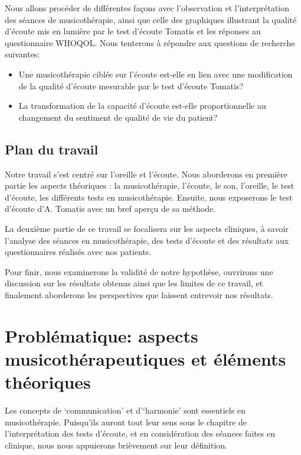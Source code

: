 Nous allons procéder de différentes façons avec l'observation et l'interprétation  des séances de 
musicothérapie, ainsi que celle des graphiques illustrant la qualité d'écoute mis en lumière par le test 
d'écoute Tomatis 
et les réponses au 
questionnaire WHOQOL. 
Nous tenterons à 
répondre aux questions de recherche suivantes: 

\begin{itemize}
\item Une musicothérapie ciblée sur l'écoute  est-elle en lien avec une modification de la qualité d'écoute 
mesurable par le test d'écoute Tomatis?
  \item La transformation de la capacité d'écoute est-elle  proportionnelle au changement 
  du sentiment de qualité de vie du patient?
   \end{itemize}




\section*{Plan du travail}
Notre travail s'est centré sur l'oreille et l'écoute.
Nous aborderons en première partie les aspects théoriques : la musicothérapie, l'écoute, le son, l'oreille, 
le
test d'écoute, les différents tests en musicothérapie. Ensuite, nous
exposerons le test d'écoute d'A. Tomatis avec un bref aperçu de sa méthode.


La deuxième partie de ce travail se focalisera sur les aspects
cliniques, à savoir l'analyse des séances en  musicothérapie,  des tests d'écoute et des résultats aux 
questionnaires  réalisés  avec  nos patients.



Pour finir, nous examinerons la validité de notre hypothèse, ouvrirons
une discussion sur les résultats obtenus ainsi que les limites de ce
travail, et finalement aborderons les perspectives que
laissent entrevoir nos résultats.


\chapter{Problématique: aspects musicothérapeutiques et éléments théoriques}
Les concepts de `communication' et  d'`harmonie'
sont essentiels en
musicothérapie. Puisqu'ils auront tout  leur sens sous le chapitre de l'interprétation des tests
d'écoute, et en considération des séances faites en clinique, nous nous appuierons brièvement
sur leur définition. 
